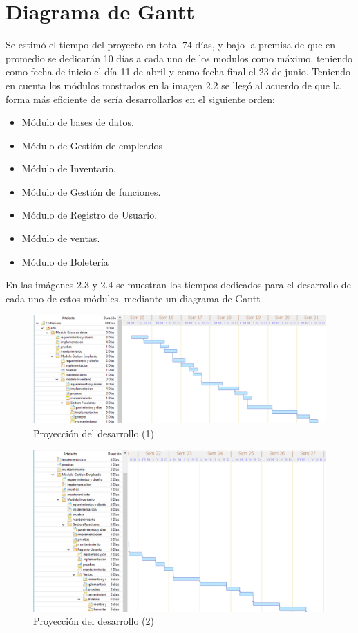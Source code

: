 \section{Diagrama de Gantt}
Se estimó el tiempo del proyecto en total 74 días, y bajo la premisa de que en promedio se dedicarán 10 días a cada uno de los modulos como máximo, teniendo como fecha de inicio el día 11 de abril y como fecha final el 23 de junio.
Teniendo en cuenta los módulos mostrados en la imagen 2.2 se llegó al acuerdo de que la forma más eficiente de sería desarrollarlos en el siguiente orden:
\begin{itemize}
	\item Módulo de bases de datos.
	\item Módulo de Gestión de empleados
	\item Módulo de Inventario.
	\item Módulo de Gestión de funciones.
	\item Módulo de Registro de Usuario.
	\item Módulo de ventas.
	\item Módulo de Boletería
\end{itemize}

En las imágenes 2.3 y 2.4 se muestran los tiempos dedicados para el desarrollo de cada uno de estos módules, mediante un diagrama de Gantt
\begin{figure}[h!]
	\centering
\includegraphics[width=1\linewidth]{proyecto/proceso/imgs/modulo1}
	\caption{Proyección del desarrollo (1)}
\end{figure}
\begin{figure}[h!]
	\centering
\includegraphics[width=0.9\linewidth]{proyecto/proceso/imgs/modulo2}
	\caption{Proyección del desarrollo (2)}
\end{figure}

